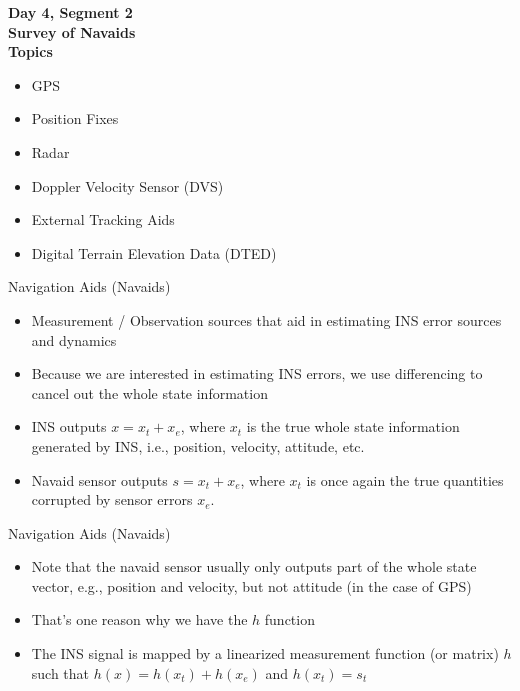 \begin{frame}
\textbf{Day 4, Segment 2\\
Survey of Navaids\\
Topics}
 \begin{itemize}
 \item GPS
 \item Position Fixes
 \item Radar
 \item Doppler Velocity Sensor (DVS)
 \item External Tracking Aids
 \item Digital Terrain Elevation Data (DTED)
\end{itemize}
\end{frame}
\begin{frame}
\end{frame}

\begin{frame}
Navigation Aids (Navaids)
\begin{itemize}
  \item Measurement / Observation sources that aid in estimating INS error sources and dynamics
  \item Because we are interested in estimating INS errors, we use differencing to cancel out the whole state information
  \item INS outputs $x=x_t + x_e$, where $x_t$ is the true whole state information generated by INS, i.e., position, velocity, attitude, etc.
  \item Navaid sensor outputs $s=x_t+x_e$, where $x_t$ is once again the true quantities corrupted by sensor errors $x_e$.
\end{itemize} 
\end{frame}

\begin{frame}
Navigation Aids (Navaids)
\begin{itemize}
  \item Note that the navaid sensor usually only outputs part of the whole state vector, e.g., position and velocity, but not attitude (in the case of GPS)
  \item That's one reason why we have the $h$ function
  \item The INS signal is mapped by a linearized measurement function (or matrix) $h$ such that $h(x)=h(x_t) + h(x_e)$ and $h(x_t)=s_t$
\end{itemize} 
\end{frame}

